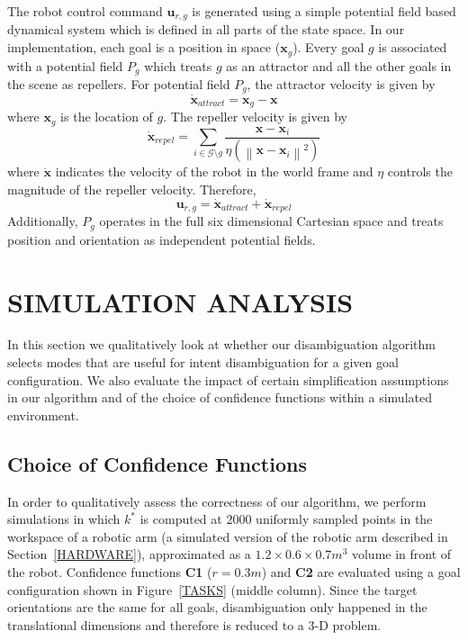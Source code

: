 \documentclass[conference]{IEEEtran}
\newcommand{\norm}[1]{\left\lVert#1\right\rVert}
\begin{document}
The robot control command $\boldsymbol{u}_{r,g}$ is generated using a simple potential field based dynamical system which is defined in all parts of the state space. In our implementation, each goal is a position in space ($\boldsymbol{x}_g$). Every goal $g$ is associated with a potential field $P_g$ which treats $g$ as an attractor and all the other goals in the scene as repellers. For potential field $P_g$, the attractor velocity is given by
\begin{equation*}
\dot{\boldsymbol{x}}_{attract} = \boldsymbol{x}_{g} - \boldsymbol{x}
\end{equation*}
where $\boldsymbol{x}_{g}$ is the location of $g$. The repeller velocity is given by
\begin{equation*}
\dot{\boldsymbol{x}}_{repel} = \sum_{i \in \mathcal{G} \setminus g} \frac{\boldsymbol{x} - \boldsymbol{x}_{i}}{\eta(\norm{\boldsymbol{x} - \boldsymbol{x}_{i}}^2)}
\end{equation*}
where $\dot{\boldsymbol{x}}$ indicates the velocity of the robot in the world frame and $\eta$ controls the magnitude of the repeller velocity. Therefore, 
\begin{equation*}
\boldsymbol{u}_{r,g} = \dot{\boldsymbol{x}}_{attract} + \dot{\boldsymbol{x}}_{repel} 
\end{equation*}
Additionally, $P_g$ operates in the full six dimensional Cartesian space and treats position and orientation as independent potential fields. 

\section{SIMULATION ANALYSIS} \label{SIMRESULTS}
In this section we qualitatively look at whether our disambiguation algorithm selects modes that are useful for intent disambiguation for a given goal configuration. We also evaluate the impact of certain simplification assumptions in our algorithm and of the choice of confidence functions within a simulated environment.

\subsection{Choice of Confidence Functions}
In order to qualitatively assess the correctness of our algorithm, we perform simulations in which $k^*$ is computed at $2000$ uniformly sampled points in the workspace of a robotic arm (a simulated version of the robotic arm described in Section~\ref{HARDWARE}), approximated as a $1.2\times0.6\times0.7 m^3$ volume in front of the robot. Confidence functions \textbf{C1} ($r=0.3m$) and \textbf{C2} are evaluated using a goal configuration shown in Figure~\ref{TASKS} (middle column). Since the target orientations are the same for all goals, disambiguation only happened in the translational dimensions and therefore is reduced to a 3-D problem.
\end{document}
